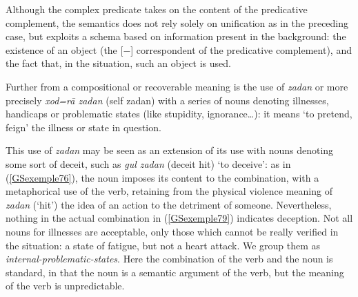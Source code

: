 \documentclass[output=paper
                ,modfonts
                ,nonflat
	        ,collection
	        ,collectionchapter
	        ,collectiontoclongg
 	        ,biblatex
                ,babelshorthands
                ,newtxmath
                ,draftmode
                ,colorlinks, citecolor=brown
]{./langsci/langscibook}
\begin{document}
{Although the complex predicate takes on the content of the predicative complement, the semantics does not rely solely on unification as in the preceding case, but exploits a schema based on information present in the background: the existence of an object (the [\prd $-$] correspondent of the predicative complement), and the fact that, in the situation, such an object is used.  

Further from a compositional or recoverable meaning is the use of \emph{zadan} or more precisely \emph{xod=r\=a zadan} (self zadan) with a series of nouns denoting illnesses, handicaps or problematic states (like stupidity, ignorance…): it means `to pretend, feign' the illness or state in question.

\z

This use of \emph{zadan} may be seen as an extension of its use with nouns denoting some sort of deceit, such as \emph{gul zadan} (deceit hit) `to deceive’: as in (\ref{GSexemple76}), the noun imposes its content to the combination, with a metaphorical use of the verb, retaining from the physical violence meaning of \emph{zadan} (`hit’) the idea of an action to the detriment of someone. Nevertheless, nothing in the actual combination in (\ref{GSexemple79}) indicates deception. Not all nouns for illnesses are acceptable, only those which cannot be really verified in the situation: a state of fatigue, but not a heart attack. We group them as \emph{internal-problematic-states}. Here the combination of the verb and the noun is standard, in that the noun is a semantic argument of the verb, but the meaning of the verb is unpredictable.

\begin{exe}
\end{exe}

}
\end{document}
